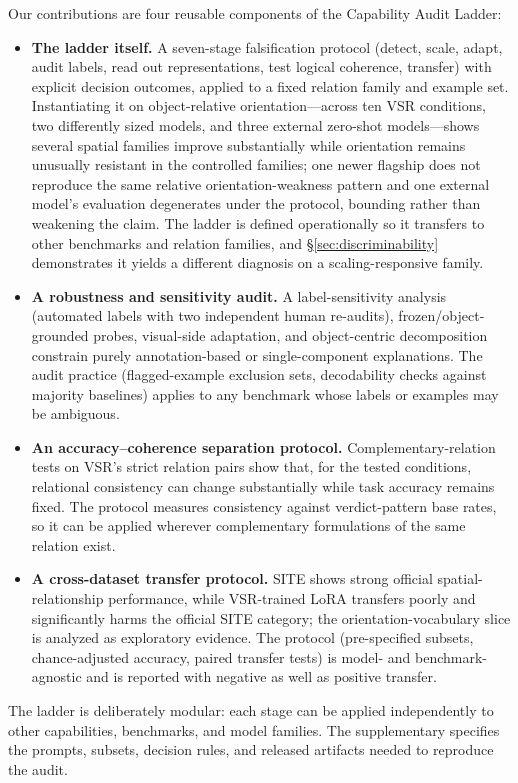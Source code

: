 \documentclass[10pt,twocolumn,letterpaper]{article}
\begin{document}
Our contributions are four reusable components of the Capability Audit Ladder:
\begin{itemize}[leftmargin=*]
    \item \textbf{The ladder itself.} A seven-stage falsification protocol (detect, scale, adapt, audit labels, read out representations, test logical coherence, transfer) with explicit decision outcomes, applied to a fixed relation family and example set. Instantiating it on object-relative orientation---across ten VSR conditions, two differently sized models, and three external zero-shot models---shows several spatial families improve substantially while orientation remains unusually resistant in the controlled families; one newer flagship does not reproduce the same relative orientation-weakness pattern and one external model's evaluation degenerates under the protocol, bounding rather than weakening the claim. The ladder is defined operationally so it transfers to other benchmarks and relation families, and \S\ref{sec:discriminability} demonstrates it yields a different diagnosis on a scaling-responsive family.
    \item \textbf{A robustness and sensitivity audit.} A label-sensitivity analysis (automated labels with two independent human re-audits), frozen/object-grounded probes, visual-side adaptation, and object-centric decomposition constrain purely annotation-based or single-component explanations. The audit practice (flagged-example exclusion sets, decodability checks against majority baselines) applies to any benchmark whose labels or examples may be ambiguous.
    \item \textbf{An accuracy--coherence separation protocol.} Complementary-relation tests on VSR's strict relation pairs show that, for the tested conditions, relational consistency can change substantially while task accuracy remains fixed. The protocol measures consistency against verdict-pattern base rates, so it can be applied wherever complementary formulations of the same relation exist.
    \item \textbf{A cross-dataset transfer protocol.} SITE shows strong official spatial-relationship performance, while VSR-trained LoRA transfers poorly and significantly harms the official SITE category; the orientation-vocabulary slice is analyzed as exploratory evidence. The protocol (pre-specified subsets, chance-adjusted accuracy, paired transfer tests) is model- and benchmark-agnostic and is reported with negative as well as positive transfer.
\end{itemize}
The ladder is deliberately modular: each stage can be applied independently to other capabilities, benchmarks, and model families. The supplementary specifies the prompts, subsets, decision rules, and released artifacts needed to reproduce the audit.
\end{document}
